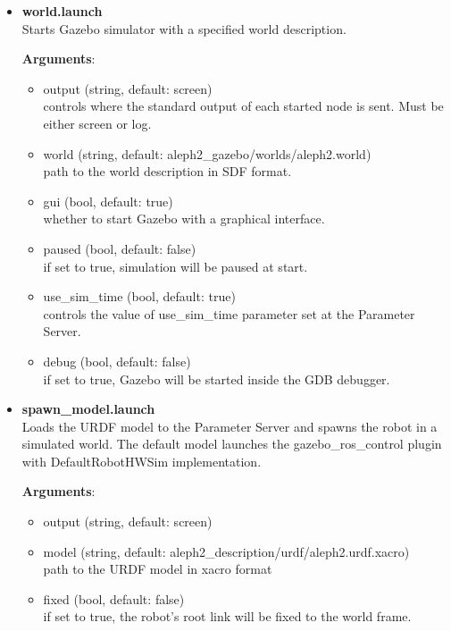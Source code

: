 \documentclass[english,inz,shortabstract]{iithesis}
\newcommand{\val}[1]{\textbf{\textsf{#1}}}
\begin{document}
	\begin{itemize}
		\item \val{world.launch}\\
		Starts Gazebo simulator with a specified world description.

		\textbf{Arguments}:
		\begin{itemize}[itemsep=0pt, parsep=2pt, topsep=0pt]
			\item \textsf{output} (\textsf{string}, default: \textsf{screen})\\
			controls where the standard output of each started node is sent. Must be either \textsf{screen} or \textsf{log}.
			\item \textsf{world} (\textsf{string}, default: \textsf{aleph2\_gazebo/worlds/aleph2.world})\\
			path to the world description in SDF format.
			\item \textsf{gui} (\textsf{bool}, default: \textsf{true})\\
			whether to start Gazebo with a graphical interface.
			\item \textsf{paused} (\textsf{bool}, default: \textsf{false})\\
			if set to \textsf{true}, simulation will be paused at start.
			\item \textsf{use\_sim\_time} (\textsf{bool}, default: \textsf{true})\\
			controls the value of \textsf{use\_sim\_time} parameter set at the Parameter Server.
			\item \textsf{debug} (\textsf{bool}, default: \textsf{false})\\
			if set to \textsf{true}, Gazebo will be started inside the GDB debugger.
		\end{itemize}

		\item \val{spawn\_model.launch}\\
		Loads the URDF model to the Parameter Server and spawns the robot in a simulated world. The default model launches the \textsf{gazebo\_ros\_control} plugin with \textsf{DefaultRobotHWSim} implementation.

		\textbf{Arguments}:
		\begin{itemize}[itemsep=0pt, parsep=2pt, topsep=0pt]
			\item \textsf{output} (\textsf{string}, default: \textsf{screen})
			\item \textsf{model} (\textsf{string}, default: \textsf{aleph2\_description/urdf/aleph2.urdf.xacro})\\
			path to the URDF model in xacro format
			\item \textsf{fixed} (\textsf{bool}, default: \textsf{false})\\
			if set to \textsf{true}, the robot's root link will be fixed to the world frame.
		\end{itemize}


\end{itemize}
\end{document}
